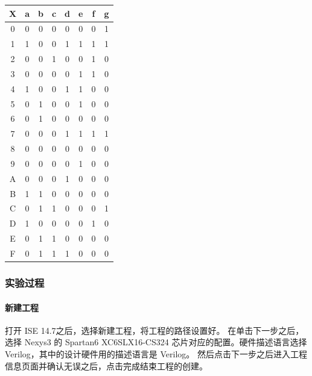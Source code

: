 \documentclass{ctexart}
\begin{document}
            \begin{center}
            \begin{tabular}{c|ccccccc}
                X & a & b & c & d & e & f & g \\ \hline
                0 & 0 & 0 & 0 & 0 & 0 & 0 & 1 \\ 
                1 & 1 & 0 & 0 & 1 & 1 & 1 & 1 \\ 
                2 & 0 & 0 & 1 & 0 & 0 & 1 & 0 \\ 
                3 & 0 & 0 & 0 & 0 & 1 & 1 & 0 \\ 
                4 & 1 & 0 & 0 & 1 & 1 & 0 & 0 \\ 
                5 & 0 & 1 & 0 & 0 & 1 & 0 & 0 \\ 
                6 & 0 & 1 & 0 & 0 & 0 & 0 & 0 \\ 
                7 & 0 & 0 & 0 & 1 & 1 & 1 & 1 \\ 
                8 & 0 & 0 & 0 & 0 & 0 & 0 & 0 \\ 
                9 & 0 & 0 & 0 & 0 & 1 & 0 & 0 \\ 
                A & 0 & 0 & 0 & 1 & 0 & 0 & 0 \\ 
                B & 1 & 1 & 0 & 0 & 0 & 0 & 0 \\ 
                C & 0 & 1 & 1 & 0 & 0 & 0 & 1 \\ 
                D & 1 & 0 & 0 & 0 & 0 & 1 & 0 \\ 
                E & 0 & 1 & 1 & 0 & 0 & 0 & 0 \\ 
                F & 0 & 1 & 1 & 1 & 0 & 0 & 0 \\ 
            \end{tabular} 
            \end{center}         
            
            
            \subsubsection{实验过程}
            
            \paragraph{新建工程}
            
            打开 ISE 14.7之后，选择新建工程，将工程的路径设置好。
            在单击下一步之后，选择 Nexys3 的 Spartan6 XC6SLX16-CS324 芯片对应的配置。硬件描述语言选择 Verilog，其中的设计硬件用的描述语言是 Verilog。
            然后点击下一步之后进入工程信息页面并确认无误之后，点击完成结束工程的创建。
            
\end{document}
